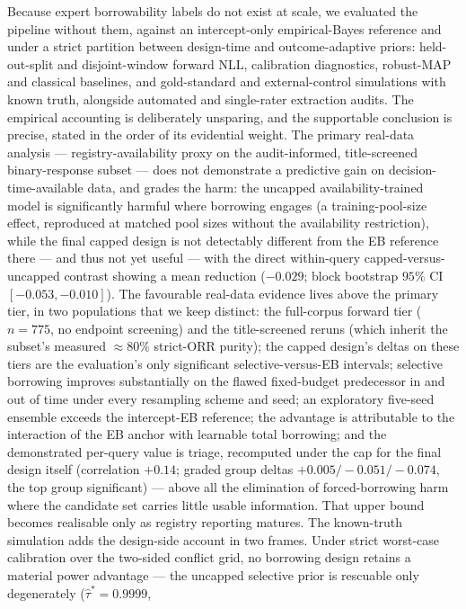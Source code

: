 \documentclass[11pt]{article}
\begin{document}
Because expert borrowability labels do not exist at scale, we evaluated the
pipeline without them, against an intercept-only empirical-Bayes reference and
under a strict partition between design-time and outcome-adaptive priors:
held-out-split and disjoint-window forward NLL, calibration diagnostics,
robust-MAP and classical baselines, and gold-standard and external-control
simulations with known truth, alongside automated and single-rater extraction
audits. The
empirical accounting is deliberately unsparing, and the supportable
conclusion is precise, stated in the order of its evidential weight. The
primary real-data analysis --- registry-availability proxy on the
audit-informed, title-screened binary-response subset --- does not
demonstrate a
predictive gain on decision-time-available data, and grades the harm: the
uncapped availability-trained model is significantly harmful where borrowing
engages (a training-pool-size effect, reproduced at matched pool sizes
without the availability restriction), while the final capped design is
not detectably different from the EB reference there --- and thus not
yet useful --- with the direct within-query capped-versus-uncapped
contrast showing a mean reduction ($-0.029$; block bootstrap $95\%$ CI
$[-0.053,-0.010]$). The favourable
real-data
evidence lives above the primary tier, in two populations that we keep
distinct: the full-corpus forward tier ($n=775$, no endpoint screening)
and the title-screened reruns (which inherit the subset's measured
$\approx 80\%$ strict-ORR purity); the capped design's deltas on these
tiers are the evaluation's only significant
selective-versus-EB intervals; selective borrowing improves substantially
on the flawed fixed-budget predecessor in and out of time under every
resampling scheme and seed; an exploratory five-seed ensemble exceeds the
intercept-EB reference; the advantage is attributable to the interaction of
the EB anchor with learnable total borrowing; and the demonstrated
per-query value is triage, recomputed under the cap for the final
design itself (correlation $+0.14$; graded group deltas
$+0.005/-0.051/-0.074$, the top group significant) --- above all the
elimination of forced-borrowing
harm where the candidate set carries little usable information. That upper
bound becomes realisable only as registry reporting matures. The
known-truth simulation adds the design-side account in two frames. Under
strict worst-case calibration over the two-sided conflict grid, no
borrowing design retains a material power advantage --- the uncapped
selective prior is rescuable only degenerately ($\hat\tau^{*} = 0.9999$,
\end{document}
